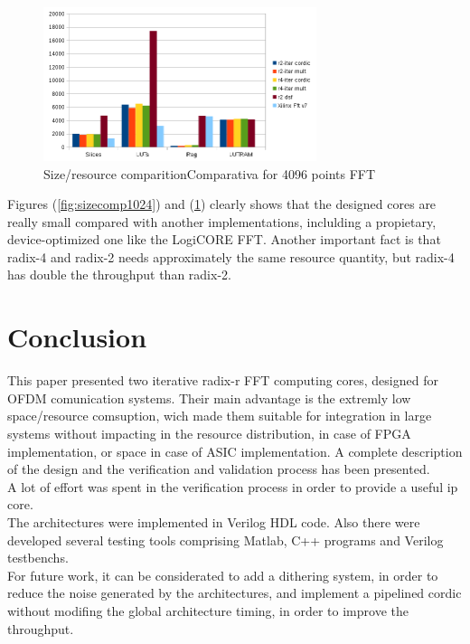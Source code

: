 \documentclass[conference]{IEEEtran}
\begin{document}
\begin{figure}[htb!]
        \centering
        \includegraphics[width=8cm]{./figures/sizecomp4096.png}
        \caption{Size/resource comparitionComparativa for 4096 points FFT}
        \label{fig:sizecomp4096}
\end{figure}

Figures (\ref{fig:sizecomp1024}) and (\ref{fig:sizecomp4096}) clearly shows that the designed cores are really small compared 
with another implementations, inclulding a propietary, device-optimized one like the LogiCORE FFT. Another important fact is that 
radix-4 and radix-2 needs approximately the same resource quantity, but radix-4 has double the throughput than radix-2.  

\section{Conclusion}
This paper presented two iterative radix-r FFT computing cores, designed for OFDM
comunication systems. Their main advantage is the extremly low space/resource comsuption, wich made them suitable for
integration in large systems without impacting in the resource distribution, in case of FPGA implementation, or space in case of
ASIC implementation. A complete description of the design and the verification and validation process has been presented.\\ 
A lot of effort was spent in the verification process in order to provide a useful ip core.\\
The architectures were implemented in Verilog HDL code. Also there were developed several testing tools
comprising Matlab, C++ programs and Verilog testbenchs.\\
For future work, it can be considerated to add a dithering system, in order to reduce the noise generated by the architectures, and 
implement a pipelined cordic without modifing the global architecture timing, in order to improve the throughput. 



\end{document}
